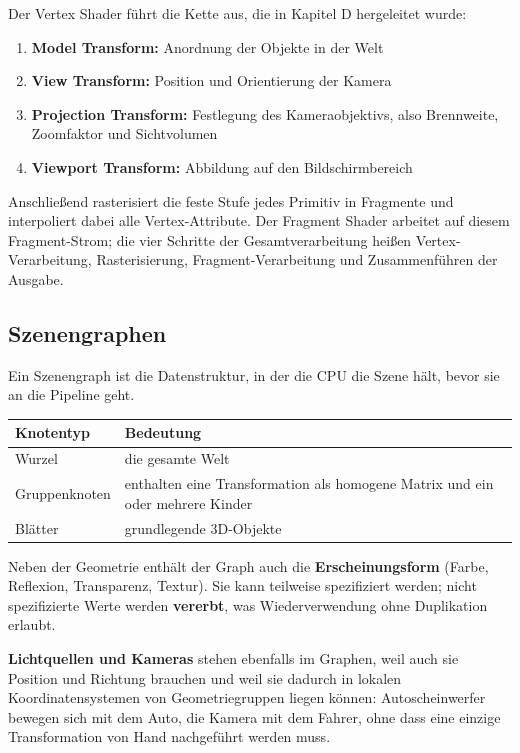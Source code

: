 \documentclass[12pt, a4paper]{article}
\begin{document}
Der Vertex Shader führt die Kette aus, die in Kapitel D hergeleitet wurde:

\begin{enumerate}
  \item \textbf{Model Transform:} Anordnung der Objekte in der Welt
  \item \textbf{View Transform:} Position und Orientierung der Kamera
  \item \textbf{Projection Transform:} Festlegung des Kameraobjektivs, also Brennweite,
        Zoomfaktor und Sichtvolumen
  \item \textbf{Viewport Transform:} Abbildung auf den Bildschirmbereich
\end{enumerate}

Anschließend rasterisiert die feste Stufe jedes Primitiv in Fragmente und interpoliert
dabei alle Vertex-Attribute. Der Fragment Shader arbeitet auf diesem Fragment-Strom;
die vier Schritte der Gesamtverarbeitung heißen Vertex-Verarbeitung, Rasterisierung,
Fragment-Verarbeitung und Zusammenführen der Ausgabe.

\subsection{Szenengraphen}

Ein Szenengraph ist die Datenstruktur, in der die CPU die Szene hält, bevor sie an die
Pipeline geht.

\begin{center}
\begin{tabular}{@{}p{3.2cm}p{10cm}@{}}
\toprule
\textbf{Knotentyp} & \textbf{Bedeutung} \\
\midrule
Wurzel & die gesamte Welt \\
Gruppenknoten & enthalten eine Transformation als homogene Matrix und ein oder mehrere Kinder \\
Blätter & grundlegende 3D-Objekte \\
\bottomrule
\end{tabular}
\end{center}

Neben der Geometrie enthält der Graph auch die \textbf{Erscheinungsform} (Farbe,
Reflexion, Transparenz, Textur). Sie kann teilweise spezifiziert werden; nicht
spezifizierte Werte werden \textbf{vererbt}, was Wiederverwendung ohne Duplikation
erlaubt.

\textbf{Lichtquellen und Kameras} stehen ebenfalls im Graphen, weil auch sie Position
und Richtung brauchen und weil sie dadurch in lokalen Koordinatensystemen von
Geometriegruppen liegen können: Autoscheinwerfer bewegen sich mit dem Auto, die Kamera
mit dem Fahrer, ohne dass eine einzige Transformation von Hand nachgeführt werden muss.
\end{document}
